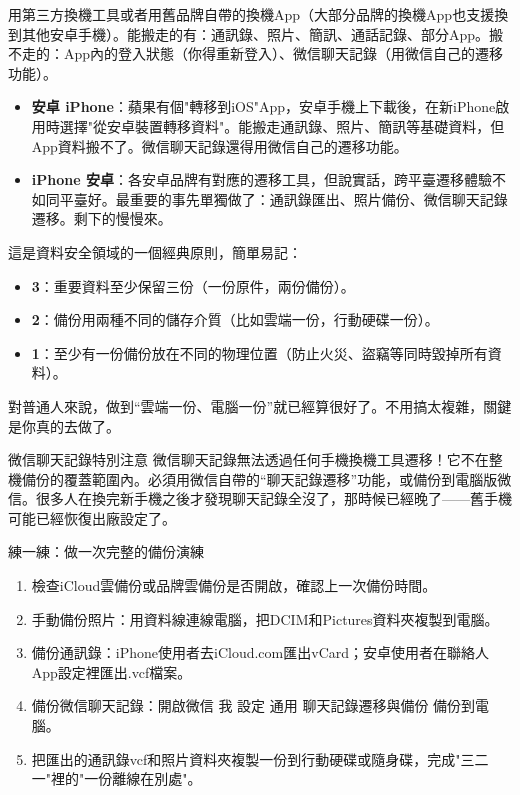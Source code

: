 
用第三方換機工具或者用舊品牌自帶的換機App（大部分品牌的換機App也支援換到其他安卓手機）。能搬走的有：通訊錄、照片、簡訊、通話記錄、部分App。搬不走的：App內的登入狀態（你得重新登入）、微信聊天記錄（用微信自己的遷移功能）。


\begin{itemize}
  \item \textbf{安卓 iPhone}：蘋果有個"轉移到iOS"App，安卓手機上下載後，在新iPhone啟用時選擇"從安卓裝置轉移資料"。能搬走通訊錄、照片、簡訊等基礎資料，但App資料搬不了。微信聊天記錄還得用微信自己的遷移功能。
  \item \textbf{iPhone 安卓}：各安卓品牌有對應的遷移工具，但說實話，跨平臺遷移體驗不如同平臺好。最重要的事先單獨做了：通訊錄匯出、照片備份、微信聊天記錄遷移。剩下的慢慢來。
\end{itemize}


這是資料安全領域的一個經典原則，簡單易記：

\begin{itemize}
  \item \textbf{3}：重要資料至少保留三份（一份原件，兩份備份）。
  \item \textbf{2}：備份用兩種不同的儲存介質（比如雲端一份，行動硬碟一份）。
  \item \textbf{1}：至少有一份備份放在不同的物理位置（防止火災、盜竊等同時毀掉所有資料）。
\end{itemize}

對普通人來說，做到“雲端一份、電腦一份”就已經算很好了。不用搞太複雜，關鍵是你真的去做了。

\begin{tcbwarn}{微信聊天記錄特別注意}
微信聊天記錄無法透過任何手機換機工具遷移！它不在整機備份的覆蓋範圍內。必須用微信自帶的“聊天記錄遷移”功能，或備份到電腦版微信。很多人在換完新手機之後才發現聊天記錄全沒了，那時候已經晚了——舊手機可能已經恢復出廠設定了。

\end{tcbwarn}

\begin{tcbpractice}{練一練：做一次完整的備份演練}
\begin{enumerate}
  \item 檢查iCloud雲備份或品牌雲備份是否開啟，確認上一次備份時間。
  \item 手動備份照片：用資料線連線電腦，把DCIM和Pictures資料夾複製到電腦。
  \item 備份通訊錄：iPhone使用者去iCloud.com匯出vCard；安卓使用者在聯絡人App設定裡匯出.vcf檔案。
  \item 備份微信聊天記錄：開啟微信 我 設定 通用 聊天記錄遷移與備份 備份到電腦。
  \item 把匯出的通訊錄vcf和照片資料夾複製一份到行動硬碟或隨身碟，完成"三二一"裡的"一份離線在別處"。
\end{enumerate}

\end{tcbpractice}
